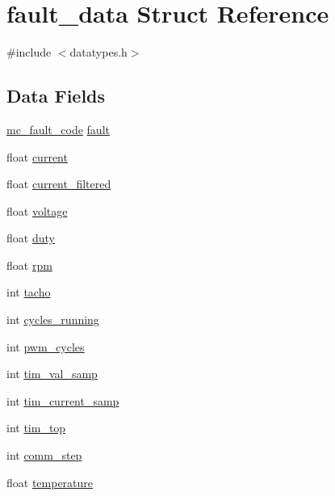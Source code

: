 \hypertarget{structfault__data}{}\section{fault\+\_\+data Struct Reference}
\label{structfault__data}


{\ttfamily \#include $<$datatypes.\+h$>$}

\subsection*{Data Fields}
\begin{DoxyCompactItemize}
\item 
\hyperlink{datatypes_8h_a29724157fc2c874a0bafeb059b571d14}{mc\+\_\+fault\+\_\+code} \hyperlink{structfault__data_aa9b1900f4f49ae926cb51e920e83e7f1}{fault}
\item 
float \hyperlink{structfault__data_af9653d31acfffa5a40aa709b2065e00b}{current}
\item 
float \hyperlink{structfault__data_af5c975d24ce2eb03d1deed3819d8d39d}{current\+\_\+filtered}
\item 
float \hyperlink{structfault__data_a47061fcae597f83f8a0a99d4b7b5a5c1}{voltage}
\item 
float \hyperlink{structfault__data_a70f44948d7630be99b15ecac985a502f}{duty}
\item 
float \hyperlink{structfault__data_a25e39b399c2a11f0d76e42ab8241a910}{rpm}
\item 
int \hyperlink{structfault__data_a9a6514335a0acc707caee25a88698919}{tacho}
\item 
int \hyperlink{structfault__data_a246d9768fab4df5814c97313f2d0b177}{cycles\+\_\+running}
\item 
int \hyperlink{structfault__data_a0ff6cecbd2386a32bdaa09d12b0d64a4}{pwm\+\_\+cycles}
\item 
int \hyperlink{structfault__data_acb424372bd0ffdc122aab91b749c96dc}{tim\+\_\+val\+\_\+samp}
\item 
int \hyperlink{structfault__data_ab8c9f702ff4f0ed843d7af91d35a2f6e}{tim\+\_\+current\+\_\+samp}
\item 
int \hyperlink{structfault__data_aee6c4f422f48b4464d9daf305280967a}{tim\+\_\+top}
\item 
int \hyperlink{structfault__data_aa6ce985078ba696f002d9cf36f32a894}{comm\+\_\+step}
\item 
float \hyperlink{structfault__data_afc1d28cfbce795d6ea954ebe725241f5}{temperature}
\end{DoxyCompactItemize}


